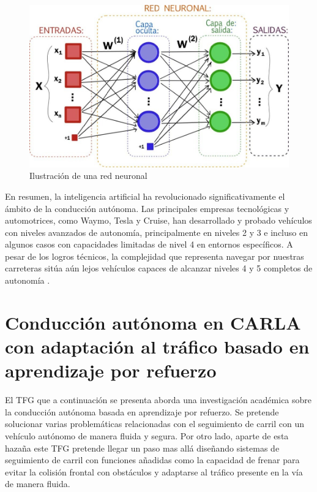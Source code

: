 \newpage

\begin{figure}[h]
	\centering
	\includegraphics[width=0.7\linewidth]{imagenes/cap1/red_neuronal.jpeg}
	\caption{Ilustración de una red neuronal}
	\label{fig:Ilustración de una red neuronal}
\end{figure}

En resumen, la inteligencia artificial ha revolucionado significativamente el ámbito de la conducción autónoma. Las principales empresas tecnológicas y automotrices, como Waymo, Tesla y Cruise, han desarrollado y probado vehículos con niveles avanzados de autonomía, principalmente en niveles 2 y 3 e incluso en algunos casos con capacidades limitadas de nivel 4 en entornos específicos. A pesar de los logros técnicos, la complejidad que representa navegar por nuestras carreteras sitúa aún lejos vehículos capaces de alcanzar niveles 4 y 5 completos de autonomía \cite{Niveles-altos-autonomía}.

\section{ Conducción autónoma en CARLA con adaptación al tráfico basado en aprendizaje por refuerzo}
\label{sec:Conducción autónoma en CARLA basada en aprendizaje por refuerzo con adaptación al tráfico}

El \ac{TFG} que a continuación se presenta aborda una investigación académica sobre la conducción autónoma basada en aprendizaje por refuerzo. Se pretende solucionar varias problemáticas relacionadas con el seguimiento de carril con un vehículo autónomo de manera fluida y segura. Por otro lado, aparte de esta hazaña este \ac{TFG} pretende llegar un paso mas allá diseñando sistemas de seguimiento de carril con funciones añadidas como la capacidad de frenar para evitar la colisión frontal con obstáculos y adaptarse al tráfico presente en la vía de manera fluida.

\bigskip




  